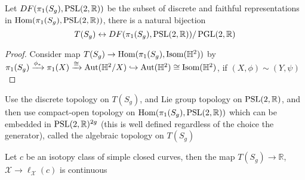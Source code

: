 \documentclass[main]{subfiles}
\begin{document}
\begin{proposition}
Let $DF(\pi_1(S_g),\operatorname{PSL}(2,\mathbb R))$ be the subset of discrete and faithful representations in $\operatorname{Hom}(\pi_1(S_g),\operatorname{PSL}(2,\mathbb R))$, there is a natural bijection
\[T(S_g)\leftrightarrow DF(\pi_1(S_g),\operatorname{PSL}(2,\mathbb R))/\operatorname{PGL}(2,\mathbb R)\]
\end{proposition}

\begin{proof}
Consider map $T(S_g)\to\operatorname{Hom}(\pi_1(S_g),\operatorname{Isom}(\mathbb H^2))$ by $\pi_1(S_g)\xrightarrow{\phi_*}\pi_1(X)\xrightarrow\cong\operatorname{Aut}(\mathbb H^2/X)\hookrightarrow\operatorname{Aut}(\mathbb H^2)\cong\operatorname{Isom}(\mathbb H^2)$, if $(X,\phi)\sim(Y,\psi)$
\end{proof}

\begin{definition}
Use the discrete topology on $T(S_g)$, and Lie group topology on $\operatorname{PSL}(2,\mathbb R)$, and then use compact-open topology on $\operatorname{Hom}(\pi_1(S_g),\operatorname{PSL}(2,\mathbb R))$ which can be embedded in $\operatorname{PSL}(2,\mathbb R)^{2g}$ (this is well defined regardless of the choice the generator), called the algebraic topology on $T(S_g)$
\end{definition}

\begin{proposition}
Let $c$ be an isotopy class of simple closed curves, then the map $T(S_g)\to\mathbb R$, $\mathcal X\to\ell_{\mathcal X}(c)$ is continuous
\end{proposition}
\end{document}

